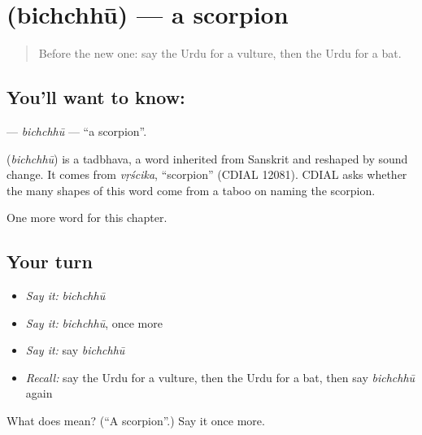 \section[\texorpdfstring{\ur{بچھو} (bichchhū)}{بچھو (bichchhū)}]{ (bichchhū) — a scorpion}

\label{lesson:UR-C208-bichchhu}



\begin{quote}
Before the new one: say the Urdu for a vulture, then the Urdu for a bat.
\end{quote}

\subsection*{You'll want to know: }
\textbf{} — \emph{bichchhū} — \textquotedblleft{}a scorpion\textquotedblright{}.

\begin{cousinweb}
\textbf{} (\emph{bichchhū}) is a tadbhava, a word inherited from Sanskrit and reshaped by sound change. It comes from \emph{vṛścika}, \textquotedblleft{}scorpion\textquotedblright{} (CDIAL 12081). CDIAL asks whether the many shapes of this word come from a taboo on naming the scorpion.
\end{cousinweb}

\begin{grammarlens}[title={What you've built}]
One more word for this chapter.
\end{grammarlens}

\subsection*{Your turn}
\begin{itemize}
\raggedright
  \item \emph{Say it:} \emph{bichchhū}
  \item \emph{Say it:} \emph{bichchhū}, once more
  \item \emph{Say it:} say \emph{bichchhū}
  \item \emph{Recall:} say the Urdu for a vulture, then the Urdu for a bat, then say \emph{bichchhū} again
\end{itemize}

\begin{tcolorbox}[breakable,colback=teal!4,colframe=teal!35!black,title={Before you move on}]
What does  mean? (\textquotedblleft{}A scorpion\textquotedblright{}.) Say it once more.
\end{tcolorbox}
